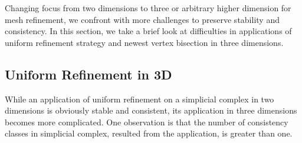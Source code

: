 Changing focus from two dimensions to three or arbitrary higher dimension for mesh refinement, we confront with more challenges to preserve stability and consistency. In this section, we take a brief look at difficulties in applications of uniform refinement strategy and newest vertex bisection in three dimensions.

\subsection{Uniform Refinement in 3D}
While an application of uniform refinement on a simplicial complex in two dimensions is obviously stable and consistent, its application in three dimensions becomes more complicated. One observation is that the number of consistency classes in simplicial complex, resulted from the application, is greater than one.

